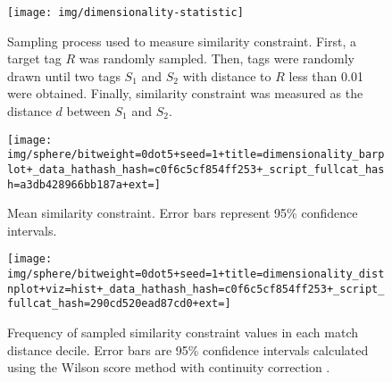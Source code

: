 \begin{figure*}[!htbp]
\begin{center}

\begin{minipage}{\linewidth}
\begin{subfigure}[b]{\linewidth}
\begin{minipage}{0.5\textwidth}
\begin{center}
\texttt{[image: img/dimensionality-statistic]}
\end{center}
\end{minipage}%
\begin{minipage}{0.5\textwidth}
\caption{
Sampling process used to measure similarity constraint.
First, a target tag $R$ was randomly sampled.
Then, tags were randomly drawn until two tags $S_1$ and $S_2$ with distance to $R$ less than 0.01 were obtained.
Finally, similarity constraint was measured as the distance $d$ between $S_1$ and $S_2$.
}
\label{fig:dimensionality_measure}
\end{minipage}
\end{subfigure}
\end{minipage}
\begin{subfigure}[b]{\linewidth}
\begin{minipage}{0.6\linewidth}
\texttt{[image: img/sphere/bitweight=0dot5+seed=1+title=dimensionality\_barplot+\_data\_hathash\_hash=c0f6c5cf854ff253+\_script\_fullcat\_hash=a3db428966bb187a+ext=]}
\end{minipage}
\begin{minipage}{0.35\linewidth}
\caption{
Mean similarity constraint.
Error bars represent 95\% confidence intervals.
}
\label{fig:sphere_barplot}
\end{minipage}
\end{subfigure}
\begin{minipage}{\linewidth}
\begin{subfigure}[b]{\linewidth}
\centering
\texttt{[image: img/sphere/bitweight=0dot5+seed=1+title=dimensionality\_distnplot+viz=hist+\_data\_hathash\_hash=c0f6c5cf854ff253+\_script\_fullcat\_hash=290cd520ead87cd0+ext=]}
\begin{minipage}{0.8\textwidth}
\caption{
Frequency of sampled similarity constraint values in each match distance decile.
Error bars are 95\% confidence intervals calculated using the Wilson score method with continuity correction \citep{newcombe1998two}.
}
\label{fig:sphere_distnplot}
\end{minipage}
\end{subfigure}
\end{minipage}

\caption{
Similarity constraint of tag-matching metrics.
Figure \ref{fig:dimensionality_measure} summarizes the sampling process used to measure similarity constraint.
Figures \ref{fig:sphere_barplot} and \ref{fig:sphere_distnplot} compare distributions of similarity constraint across metrics.
Supplementary Figure \ref{fig:sphere_supp} visualizes the cumulative distribution of all sampled dissimilarity constraint values for each metric.
}
\label{fig:sphere}

\end{center}
\end{figure*}
